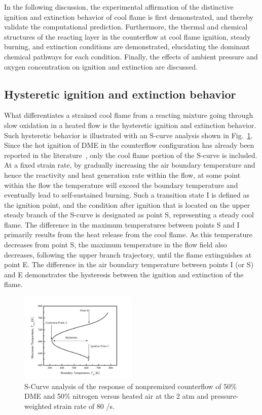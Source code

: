 \documentclass[review,3p,times]{elsarticle}
\begin{document}
In the following discussion, the experimental affirmation of the distinctive ignition and extinction behavior of cool flame is first demonstrated, and thereby validate the computational prediction.  Furthermore, the thermal and chemical structures of the reacting layer in the counterflow at cool flame ignition, steady burning, and extinction conditions are demonstrated, elucidating the dominant chemical pathways for each condition.  Finally, the effects of ambient pressure and oxygen concentration on ignition and extinction are discussed.

\subsection{Hysteretic ignition and extinction behavior}\label{sec:phenomenon}

What differentiates a strained cool flame from a reacting mixture going through slow oxidation in a heated flow is the hysteretic ignition and extinction behavior.  Such hysteretic behavior is illustrated with an S-curve analysis shown in Fig.~\ref{fig:S-curve}.  \textcolor{Rev1}{Since the hot ignition of DME in the counterflow configuration has already been reported in the literature~\cite{zheng05}, only the cool flame portion of the S-curve is included.}  At a fixed strain rate, by gradually increasing the air boundary temperature and hence the reactivity and heat generation rate within the flow, at some point within the flow the temperature will exceed the boundary temperature and eventually lead to self-sustained burning.  Such a transition state I is defined as the ignition point, and the condition after ignition that is located on the upper steady branch of the S-curve is designated as point S, representing a steady cool flame.  The difference in the maximum temperatures between points S and I primarily results from the heat release from the cool flame.  As this temperature decreases from point S, the maximum temperature in the flow field also decreases, following the upper branch trajectory, until the flame extinguishes at point E.  The difference in the air boundary temperature between points I (or S) and E demonstrates the hysteresis between the ignition and extinction of the flame. 

\begin{figure}[t]
  \centering
  \scriptsize
  \includegraphics[trim=6.5mm 7.5mm 7mm 8mm, clip=true, width=0.5\textwidth]{S-Curve.png}
  \normalsize
  \caption{S-Curve analysis of the response of nonpremixed counterflow of 50\% DME and 50\% nitrogen versus heated air at the 2 atm and pressure-weighted strain rate of 80 /s.}
  \label{fig:S-curve}
\end{figure}
\end{document}
